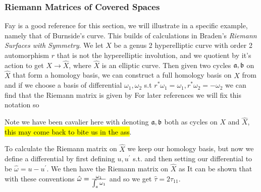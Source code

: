 \documentclass{article}
\begin{document}
\subsubsection{Riemann Matrices of Covered Spaces}
Fay \cite{Fay2006} is a good reference for this section, we will illustrate in a specific example, namely that of Burnside's curve. This builds of calculations in Braden's \textit{Riemann Surfaces with Symmetry}. We let $X$ be a genus 2 hyperelliptic curve with order 2 automorphism $r$ that is not the hyperelliptic involution, and we quotient by it's action to get $X \to \hat{X}$, where $\hat{X}$ is an elliptic curve. Then given two cycles $\mathfrak{a},\mathfrak{b}$ on $\hat{X}$ that form a homology basis, we can construct a full homology basis on $X$ from 
and if we choose a basis of differential $\omega_1, \omega_2$ s.t $r^\ast \omega_1 = \omega_1, r^\ast \omega_2 = -\omega_2$ we can find that the Riemann matrix is given by 
For later references we will fix this notation so 
\begin{remark}
	Note we have been cavalier here with denoting $\mathfrak{a},\mathfrak{b}$ both as cycles on $X$ and $\hat{X}$, \hl{this may come back to bite us in the ass}. 
\end{remark}
To calculate the Riemann matrix on $\hat{X}$ we keep our homology basis, but now we define a differential by first defining $u,u^\prime$ s.t. 
and then setting our differential to be $\hat{\omega} = u-u^\prime$. We then have the Riemann matrix on $\hat{X}$ as 
It can be shown that with these conventions $\hat{\omega} = \frac{\omega_1}{\int_{\mathfrak{a}} \omega_1}$ and so we get $\hat{\tau} = 2\tau_{11}$. \\
\end{document}
